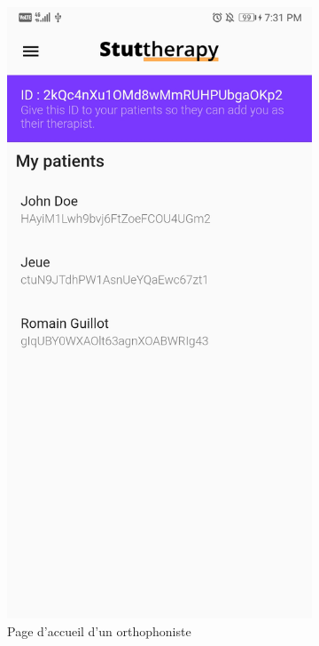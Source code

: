 \begin{appendices}
\begin{landscape}
\begin{figure}[h]
\begin{subfigure}{.25\textwidth}
    \includegraphics[width=.75\linewidth]{content/imgs/screen14.jpg}
    \caption{Page d'accueil d'un orthophoniste}
    \label{appendix:screen_therapist1}
  \end{subfigure}%
  \begin{subfigure}{.25\textwidth}
    \centering

\end{subfigure}
\end{figure}
\end{landscape}
\end{appendices}
